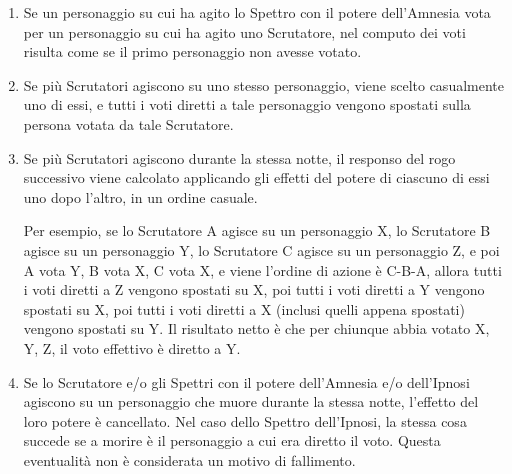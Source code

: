 \documentclass[a4paper,10pt]{article}
\begin{document}
\begin{enumerate}
 \item Se un personaggio su cui ha agito lo Spettro con il potere dell'Amnesia vota per un personaggio su cui ha agito uno Scrutatore, nel computo dei voti risulta come se il primo personaggio non avesse votato.
 
 
 \item Se più Scrutatori agiscono su uno stesso personaggio, viene scelto casualmente uno di essi, e tutti i voti diretti a tale personaggio vengono spostati sulla persona votata da tale Scrutatore.

 \item Se più Scrutatori agiscono durante la stessa notte, il responso del rogo successivo viene calcolato applicando gli effetti del potere di ciascuno di essi uno dopo l'altro, in un ordine casuale.
 
 Per esempio, se lo Scrutatore A agisce su un personaggio X, lo Scrutatore B agisce su un personaggio Y, lo Scrutatore C agisce su un personaggio Z, e poi A vota Y, B vota X, C vota X, e viene l'ordine di azione è C-B-A, allora tutti i voti diretti a Z vengono spostati su X, poi tutti i voti diretti a Y vengono spostati su X, poi tutti i voti diretti a X (inclusi quelli appena spostati) vengono spostati su Y. Il risultato netto è che per chiunque abbia votato X, Y, Z, il voto effettivo è diretto a Y.
 
 \item Se lo Scrutatore e/o gli Spettri con il potere dell'Amnesia e/o dell'Ipnosi agiscono su un personaggio che muore durante la stessa notte, l'effetto del loro potere è cancellato. 
 Nel caso dello Spettro dell'Ipnosi, la stessa cosa succede se a morire è il personaggio a cui era diretto il voto. Questa eventualità non è considerata un motivo di fallimento.
 

\end{enumerate}
\end{document}
